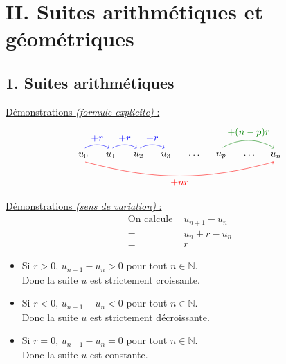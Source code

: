 \documentclass[11pt,a4paper]{article}
\title{\doctitre}
\author{\docniveau \\ \doctheme - \doctype}
\date{}
\begin{document}
\maketitle
\pagestyle{custom}
\thispagestyle{custom}

\section*{II. Suites arithmétiques et géométriques}
\subsection*{1. Suites arithmétiques}

\underline{Démonstrations \emph{(formule explicite)} :}
\begin{equation*}
  \begin{tikzpicture}[baseline=(math.base)]
    \node[anchor=east] (u0) at (0,0) {$u_0$};
    \node[anchor=east] (u1) at (1,0) {$u_1$};
    \node[anchor=east] (u2) at (2,0) {$u_2$};
    \node[anchor=east] (u3) at (3,0) {$u_3$};
    \node[anchor=east] (d) at (4.1,0) {$\dots$};
    \node[anchor=east] (up) at (5,0) {$u_p$};
    \node[anchor=east] (d) at (6.1,0) {$\dots$};
    \node[anchor=east] (un) at (7,0) {$u_n$};
    \node[inner sep=0] (math) at (u0|-u0.south) {$\phantom{u_0}$};
    \draw[->,blue,shorten >=2pt,shorten <=2pt] (u0.north) to[bend left] node[above,midway] {$+r$} (u1.north);
    \draw[->,blue,shorten >=2pt,shorten <=2pt] (u1.north) to[bend left] node[above,midway] {$+r$} (u2.north);
    \draw[->,blue,shorten >=2pt,shorten <=2pt] (u2.north) to[bend left] node[above,midway] {$+r$} (u3.north);
    \draw[->,dark_green,shorten >=2pt,shorten <=2pt] (up.north) to[bend left] node[above,midway] {$+(n-p)r$} (un.north);
    \draw[->,red,shorten >=2pt,shorten <=2pt] (u0.south) to[bend right=15] node[below,midway] {$+nr$} (un.south);
  \end{tikzpicture}
\end{equation*}

\underline{Démonstrations \emph{(sens de variation)} :}
\begin{equation*}
  \begin{split}
    \text{On calcule }& u_{n+1}-u_n \\
    = \text{ }& u_n+r-u_n \\
    = \text{ }& r
  \end{split}
\end{equation*}
\begin{itemize}
  \item Si $r>0$, $u_{n+1}-u_n>0$ pour tout $n\in\mathbb{N}$. \\
        Donc la suite $u$ est strictement croissante.
  \item Si $r<0$, $u_{n+1}-u_n<0$ pour tout $n\in\mathbb{N}$. \\
        Donc la suite $u$ est strictement décroissante.
  \item Si $r=0$, $u_{n+1}-u_n=0$ pour tout $n\in\mathbb{N}$. \\
        Donc la suite $u$ est constante. \\
\end{itemize}
\end{document}
